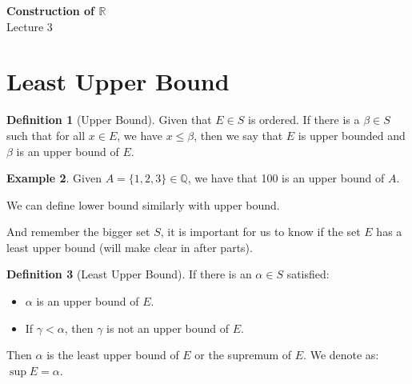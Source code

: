 \documentclass[12pt]{article}
\newcommand{\RR}{\mathbb{R}}   %
\newcommand{\QQ}{\mathbb{Q}}   %
\theoremstyle{definition}
\newtheorem{definition}{Definition}[section]
\newtheorem{example}[definition]{Example}
\theoremstyle{plain}
\begin{document}

\begin{center}
    {\Large \textbf{Construction of $\RR$}}\\[0.5em]
    {\large Lecture 3}
\end{center}

\tableofcontents

\newpage
\section{Least Upper Bound}

\begin{definition}[Upper Bound]
Given that $E \in S$ is ordered. If there is a $\beta \in S$ such that for all $x \in E$, we have $x \le \beta$, then we say that $E$ is upper bounded and $\beta$ is an upper bound of $E$.
\end{definition}

\begin{example}
Given $A = \{1,2,3\} \in \QQ$, we have that 100 is an upper bound of $A$.
\end{example}

\begin{note}
We can define lower bound similarly with upper bound.

And remember the bigger set $S$, it is important for us to know if the set $E$ has a least upper bound (will make clear in after parts).
\end{note}

\begin{definition}[Least Upper Bound]
If there is an $\alpha \in S$ satisfied:
\begin{itemize}
    \item $\alpha$ is an upper bound of $E$.
    \item If $\gamma < \alpha$, then $\gamma$ is not an upper bound of $E$.
\end{itemize}
Then $\alpha$ is the least upper bound of $E$ or the supremum of $E$. We denote as: $\sup E = \alpha$.
\end{definition}
\end{document}
